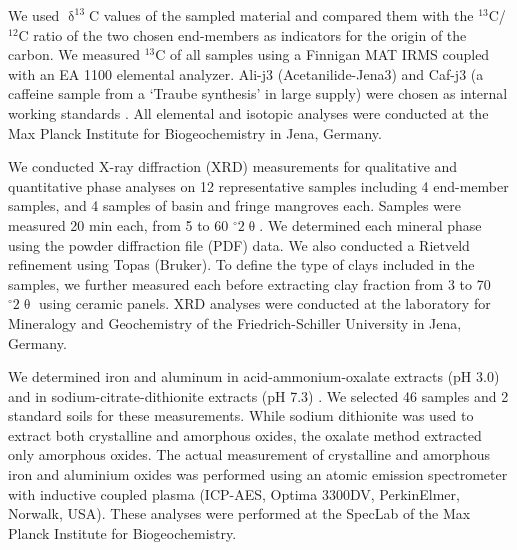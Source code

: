 We used $\updelta^{13}$C values of the sampled material and compared them with the  $^{13}$C/$^{12}$C ratio of the two chosen end-members as indicators for the origin of the carbon. We measured $^{13}$C of all samples using a Finnigan MAT IRMS coupled with an EA 1100 elemental analyzer. Ali-j3 (Acetanilide-Jena3) and Caf-j3 (a caffeine sample from a `Traube synthesis' in large supply) were chosen as internal working standards \citep{werner2001}. All elemental and isotopic analyses were conducted at the Max Planck Institute for Biogeochemistry in Jena, Germany.

We conducted X-ray diffraction (XRD) measurements for qualitative and quantitative phase analyses \citep{spiess2009} on 12 representative samples including 4 end-member samples, and 4 samples of basin and fringe mangroves each. Samples were measured 20 min each, from 5 to 60 $^{\circ}2\uptheta$. We determined each mineral phase using the powder diffraction file (PDF) data. We also conducted a Rietveld refinement using Topas (Bruker). To define the type of clays included in the samples, we further measured each before extracting clay fraction from 3 to 70 $^{\circ}2\uptheta$ using ceramic panels. XRD analyses were conducted at the laboratory for Mineralogy and Geochemistry of the Friedrich-Schiller University in Jena, Germany.

We determined iron and aluminum in acid-ammonium-oxalate extracts (pH 3.0) and in sodium-citrate-dithionite extracts (pH 7.3) \citep{Schwertmann, Holmgren1967}. We selected 46 samples and 2 standard soils for these measurements. While sodium dithionite was used to extract both crystalline and amorphous oxides, the oxalate method extracted only amorphous oxides. The actual measurement of crystalline and amorphous iron and aluminium oxides was performed using an atomic emission spectrometer with inductive coupled plasma (ICP-AES, Optima 3300DV, PerkinElmer, Norwalk, USA). These analyses were performed at the SpecLab of the Max Planck Institute for Biogeochemistry. 

